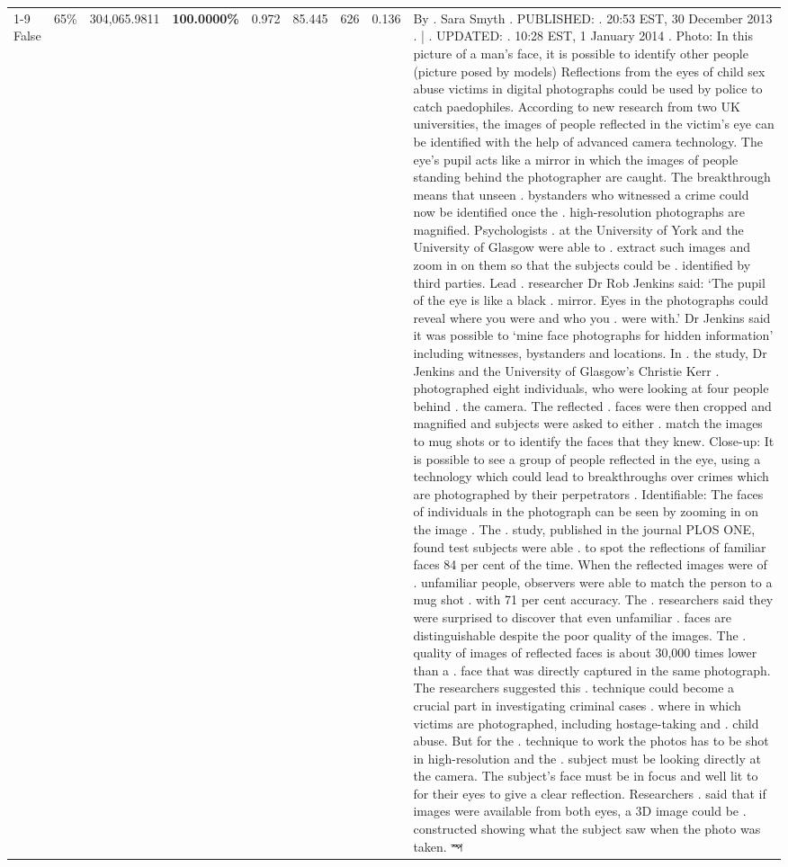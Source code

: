 \begin{table}[H]
\begin{tabular}{lllrlllll}
\cline{1-9} \cline{2-9}
False & 65\% & 304,065.9811 & \bfseries \color{red} 100.0000\% & 0.972 & 85.445 & 626 & 0.136 & By . Sara Smyth . PUBLISHED: . 20:53 EST, 30 December 2013 . | . UPDATED: . 10:28 EST, 1 January 2014 . Photo: In this picture of a man's face, it is possible to identify other people (picture posed by models) Reflections from the eyes of child sex abuse victims in digital photographs could be used by police to catch paedophiles. According to new research from two UK universities, the images of people reflected in the victim's eye can be identified with the help of advanced camera technology. The eye's pupil acts like a mirror in which the images of people standing behind the photographer are caught. The breakthrough means that unseen . bystanders who witnessed a crime could now be identified once the . high-resolution photographs are magnified. Psychologists . at the University of York and the University of Glasgow were able to . extract such images and zoom in on them so that the subjects could be . identified by third parties. Lead . researcher Dr Rob Jenkins said: ‘The pupil of the eye is like a black . mirror. Eyes in the photographs could reveal where you were and who you . were with.' Dr Jenkins said it was possible to ‘mine face photographs for hidden information' including witnesses, bystanders and locations. In . the study, Dr Jenkins and the University of Glasgow's Christie Kerr . photographed eight individuals, who were looking at four people behind . the camera. The reflected . faces were then cropped and magnified and subjects were asked to either . match the images to mug shots or to identify the faces that they knew. Close-up: It is possible to see a group of people reflected in the eye, using a technology which could lead to breakthroughs over crimes which are photographed by their perpetrators . Identifiable: The faces of individuals in the photograph can be seen by zooming in on the image . The . study, published in the journal PLOS ONE, found test subjects were able . to spot the reflections of familiar faces 84 per cent of the time. When the reflected images were of . unfamiliar people, observers were able to match the person to a mug shot . with 71 per cent accuracy. The . researchers said they were surprised to discover that even unfamiliar . faces are distinguishable despite the poor quality of the images. The . quality of images of reflected faces is about 30,000 times lower than a . face that was directly captured in the same photograph. The researchers suggested this . technique could become a crucial part in investigating criminal cases . where in which victims are photographed, including hostage-taking and . child abuse. But for the . technique to work the photos has to be shot in high-resolution and the . subject must be looking directly at the camera. The subject's face must be in focus and well lit to for their eyes to give a clear reflection. Researchers . said that if images were available from both eyes, a 3D image could be . constructed showing what the subject saw when the photo was taken. স্প \\

\end{tabular}
\end{table}
